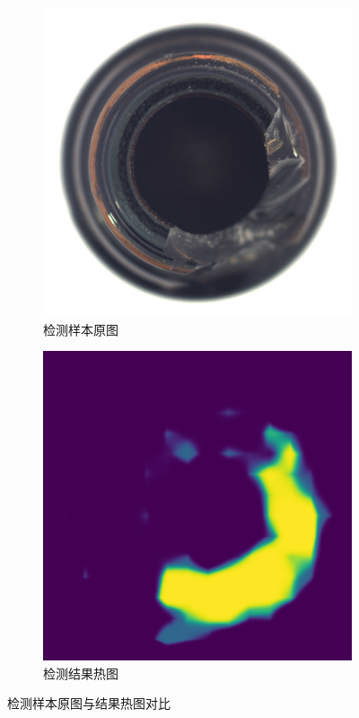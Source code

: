 \documentclass[
  ]{njuthesis}
\begin{document}
\begin{figure}[htb]
    \centering
    \begin{subfigure}{0.25\textwidth}
        \centering
        \includegraphics[width=\textwidth]{images/检测样本原图.png}
        \caption{检测样本原图}
        \label{样本原图}
    \end{subfigure}
    \hspace{2cm}
    \begin{subfigure}{0.25\textwidth}
        \centering
        \includegraphics[width=\textwidth]{images/检测结果热图.png}
        \caption{检测结果热图}
        \label{结果热图}
    \end{subfigure}
    \caption{检测样本原图与结果热图对比}
    \label{样本原图与结果热图}
\end{figure}
\end{document}
